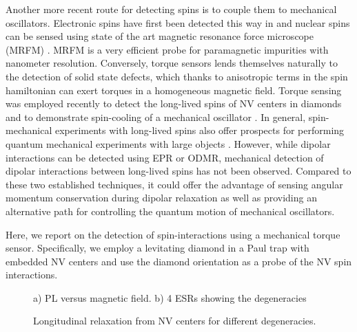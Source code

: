 \documentclass[preprintnumbers,amsmath,amssymb,superscriptaddress,twocolumn,showpacs]{revtex4-1}
\begin{document}
Another more recent route for detecting spins is to couple them to mechanical oscillators.
Electronic spins have first been detected this way in \cite{Alzetta} and nuclear spins can be sensed using state of the art magnetic resonance force microscope (MRFM) \cite{rugar, MaminH}. MRFM is a very efficient probe for paramagnetic impurities with nanometer resolution.
Conversely, torque sensors lends themselves naturally to the detection of solid state defects, which thanks to anisotropic terms in the spin hamiltonian can exert torques in a homogeneous magnetic field. 
Torque sensing was employed recently to detect the long-lived spins of NV centers in diamonds and to demonstrate spin-cooling of a mechanical oscillator \cite{DelordNat}.
In general, spin-mechanical experiments with long-lived spins also offer prospects for performing quantum mechanical experiments with large objects \cite{yin, Wan, Scala, Lee_2017}. However, while dipolar interactions can be detected using EPR or ODMR, mechanical detection of dipolar interactions between long-lived spins has not been observed. Compared to these two established techniques, it could offer the advantage of sensing angular momentum conservation during dipolar relaxation \cite{Zangara} as well as providing an alternative path for controlling the quantum motion of mechanical oscillators.

Here, we report on the detection of spin-interactions using a mechanical torque sensor.
Specifically, we employ a levitating diamond in a Paul trap with embedded NV centers and use the diamond orientation as a probe of the NV spin interactions.


\begin{figure}[!ht]
  \centering {}
  \caption{a) PL versus magnetic field. b) 4 ESRs showing the degeneracies}
  \label{scans1}
\end{figure}


\begin{figure}[!ht]
  \centering {}
  \caption{Longitudinal relaxation from NV centers for different degeneracies. 
  }\label{CR_deposited}
\end{figure}
\end{document}
